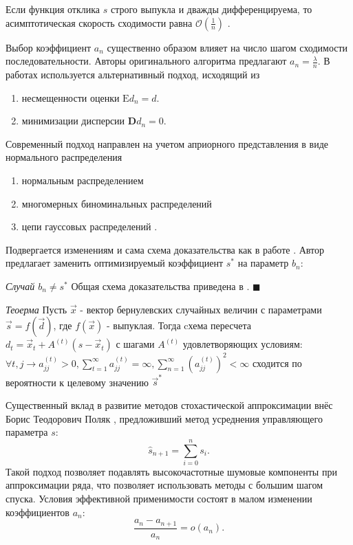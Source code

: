 Если функция отклика $s$ строго выпукла и дважды дифференцируема,
то асимптотическая скорость сходимости равна $\mathcal{O}(\frac{1}{n})$ \cite{sacks1958asymptotic}.

Выбор коэффициент $a_n$ существенно образом влияет на число шагом сходимости последовательности.
Авторы оригинального алгоритма предлагают $a_n = \frac{\lambda}{n}$. В работах \cite{lai1979adaptive}
используется альтернативный подход, исходящий из \begin{enumerate}
    \item несмещенности оценки $\mathrm{E}d_n=d$.
    \item минимизации дисперсии $\mathbf{D} d_n=0$.
\end{enumerate}
Современный подход направлен на учетом априорного представления в виде нормального распределения \begin{enumerate}
    \item нормальным распределением \cite{joseph2004efficient}
    \item многомерных биноминальных распределений \cite{xiong2018efficient}
    \item цепи гауссовых распределений \cite{liu2024robbins}.
\end{enumerate}
Подвергается изменениям и сама схема доказательства как в работе \cite{красулина2007односторонней}.
Автор предлагает заменить оптимизируемый коэффициент $s^*$ на параметр $b_n$:

\textit{Случай $b_n \ne s^*$} \label{ino}
Общая схема доказательства приведена в \cite{lai1979adaptive}.
$\blacksquare$

 
\textit{Теоерма}\cite{xiong2018efficient}
 Пусть $\vec{x}$ - вектор бернулевских случайных величин с параметрами $\vec{s}=f(\vec{d})$, где $f(\vec{x})$ - выпуклая.
 Тогда cхема пересчета $d_t=\vec{x}_t + A^{(t)} (s - \vec{x}_t)$ с шагами $A^{(t)}$ удовлетворяющих условиям:
 $\forall t,j \rightarrow a_{jj}^{(t)} >0,
 \sum^{\infty}_{t=1} a_{jj}^{(t)} = \infty,
  \sum_{n=1}^\infty (a^{(t)}_{jj})^2 < \infty$
 сходится по вероятности к целевому значению $\vec{s}^*$

Существенный вклад в развитие методов стохастической аппроксимации внёс Борис Теодорович Поляк \cite{polyak1990new},
предложивший метод усреднения управляющего параметра $s$:
 \begin{equation}
     \hat{s}_{n+1} = \sum_{i=0}^n s_i.
     \label{polyak}
 \end{equation}
Такой подход позволяет подавлять высокочастотные шумовые компоненты при аппроксимации ряда, что позволяет использовать методы с большим шагом спуска.
 Условия эффективной применимости состоят в малом изменении коэффициентов $a_n$:
 \begin{equation}
    \frac{a_{n}-a_{n+1}}{a_{n}}=\mathit{o}(a_{n}).
    \label{polyak_assumptions}
 \end{equation}

